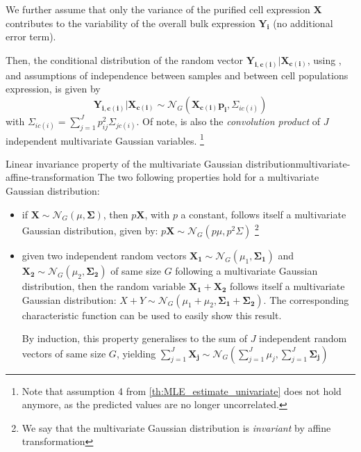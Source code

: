 We further assume that only the variance of the purified cell expression $\boldsymbol{X}$ contributes to the variability of the overall bulk expression $\boldsymbol{Y_i}$ (no additional error term).

Then, the conditional distribution of the random vector $\boldsymbol{Y_{i, c(i)}}|\boldsymbol{X_{c(i)}}$, using , and assumptions of independence between samples and between cell populations expression, is given by 
\begin{equation}
\label{eq:11}
   \boldsymbol{Y_{i, c(i)}}|\boldsymbol{X_{c(i)}} \sim \mathcal{N}_G(\boldsymbol{X_{c(i)}} \boldsymbol{p_i}, \Sigma_{ic(i)})
\end{equation}
with $\Sigma_{ic(i)}=\sum_{j=1}^J p_{ij}^2\Sigma_{jc(i)}$. Of note,  is also the \textit{convolution product} of $J$ independent multivariate Gaussian variables. \footnote{Note that assumption 4 from \ref{th:MLE_estimate_univariate} does not hold anymore, as the predicted values are no longer uncorrelated.}


\begin{Property}{Linear invariance property of the multivariate Gaussian distribution}{multivariate-affine-transformation}
The two following properties hold for a multivariate Gaussian distribution:
\begin{itemize}
    \item if $\boldsymbol{X} \sim \mathcal{N}_G( \mu, \boldsymbol{\Sigma})$, then $p\boldsymbol{X}$, with $p$ a constant, follows itself a multivariate Gaussian distribution, given by:
    $p\boldsymbol{X} \sim \mathcal{N}_G (p \mu, p^2 \Sigma)$ \footnote{We say that the multivariate Gaussian distribution is \textit{invariant} by affine transformation}
    
    \item given two independent random vectors $\boldsymbol{X_1} \sim \mathcal{N}_G(\mu_1, \boldsymbol{\Sigma_1})$ and  $\boldsymbol{X_2} \sim \mathcal{N}_G(\mu_2, \boldsymbol{\Sigma_2})$ of same size $G$ following a multivariate Gaussian distribution, then the random variable $\boldsymbol{X_1} + \boldsymbol{X_2}$ follows itself a multivariate Gaussian distribution: $X + Y \sim \mathcal{N}_G (\mu_1 + \mu_2, \boldsymbol{\Sigma_1} + \boldsymbol{\Sigma_2})$. The corresponding characteristic function can be used to easily show this result.
    
    By induction, this property generalises to the sum of $J$ independent random vectors of same size $G$, yielding $\sum_{j=1}^J \boldsymbol{X_j} \sim \mathcal{N}_G(\sum_{j=1}^J \mu_j, \sum_{j=1}^J \boldsymbol{\Sigma_j})$
\end{itemize}
\end{Property}

